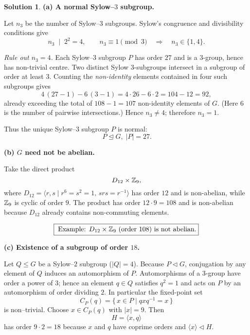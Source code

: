 \documentclass[12pt]{article}
\theoremstyle{definition} %
\newtheorem{solution}{Solution}
\theoremstyle{plain} %
\begin{document}
        \begin{solution}
        \bigskip
        \textbf{(a)  A normal Sylow–\(3\) subgroup.}
        
        Let \(n_{3}\) be the number of Sylow–\(3\) subgroups.
        Sylow’s congruence and divisibility conditions give
        \[
           n_{3}\;\mid\;2^{2}=4,
           \qquad
           n_{3}\equiv 1 \pmod{3}
           \quad\Longrightarrow\quad
           n_{3}\in\{1,4\}.
        \]
        
        \emph{Rule out \(n_{3}=4\).}
        Each Sylow–\(3\) subgroup \(P\) has order \(27\) and is a
        \(3\)-group, hence has non-trivial centre.
        Two distinct Sylow \(3\)-subgroups intersect in a subgroup
        of order at least \(3\).
        Counting the \emph{non-identity} elements contained in four such
        subgroups gives
        \[
           4\,(27-1) - 6\,(3-1) = 4\cdot26-6\cdot2 = 104-12 = 92,
        \]
        already exceeding the total of \(108-1=107\) non-identity elements of
        \(G\).  
        (Here \(6\) is the number of pairwise intersections.)
        Hence \(n_{3}\neq4\); therefore \(n_{3}=1\).
        
        Thus the unique Sylow–\(3\) subgroup \(P\) is normal:
        \[
           \boxed{\,P\trianglelefteq G,\;|P|=27.}
        \]
        
        \bigskip
        \textbf{(b)  \(G\) need not be abelian.}
        
        Take the direct product
        \[
           D_{12}\times\Bbb Z_{9},
        \]
        where \(D_{12}=\langle r,s\mid r^{6}=s^{2}=1,\,srs=r^{-1}\rangle\) has
        order \(12\) and is non-abelian, while \(\Bbb Z_{9}\) is cyclic of order
        \(9\).
        The product has order \(12\cdot9=108\) and is non-abelian because
        \(D_{12}\) already contains non-commuting elements.
        
        \[
           \boxed{\;
              \text{Example: } D_{12}\times\Bbb Z_{9}\ (\text{order }108)
              \text{ is not abelian.}}
        \]
        
        \bigskip
        \textbf{(c)  Existence of a subgroup of order \(18\).}
        
        Let \(Q\le G\) be a Sylow–\(2\) subgroup (\(|Q|=4\)).
        Because \(P\lhd G\), conjugation by any element of \(Q\) induces an
        automorphism of \(P\).  Automorphisms of a \(3\)-group have order a
        power of \(3\); hence an element \(q\in Q\) satisfies \(q^{2}=1\) and
        acts on \(P\) by an automorphism of order dividing \(2\).
        In particular the fixed-point set
        \[
           C_{P}(q)=\{\,x\in P\mid qxq^{-1}=x\,\}
        \]
        is non–trivial.  
        Choose \(x\in C_{P}(q)\) with \(|x|=9\).  
        Then
        \[
           H=\langle x,q\rangle
        \]
        has order \(9\cdot2 = 18\) because \(x\) and \(q\) have coprime orders
        and \(\langle x\rangle\lhd H\).
        

\end{solution}
\end{document}
